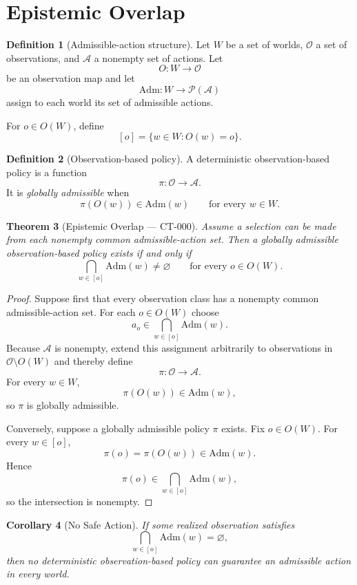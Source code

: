 \documentclass[11pt]{article}
\newtheorem{theorem}{Theorem}[section]
\newtheorem{corollary}[theorem]{Corollary}
\theoremstyle{definition}
\newtheorem{definition}[theorem]{Definition}
\theoremstyle{remark}
\newcommand{\worlds}{W}
\newcommand{\acts}{\mathcal{A}}
\newcommand{\obs}{\mathcal{O}}
\newcommand{\admissible}{\mathrm{Adm}}
\begin{document}
\section{Epistemic Overlap}

\begin{definition}[Admissible-action structure]
Let $\worlds$ be a set of worlds, $\obs$ a set of observations, and
$\acts$ a nonempty set of actions. Let
\[
  O : \worlds \to \obs
\]
be an observation map and let
\[
  \admissible : \worlds \to \mathcal{P}(\acts)
\]
assign to each world its set of admissible actions.

For $o \in O(\worlds)$, define
\[
  [o]
  =
  \{w \in \worlds : O(w)=o\}.
\]
\end{definition}

\begin{definition}[Observation-based policy]
A deterministic observation-based policy is a function
\[
  \pi : \obs \to \acts.
\]
It is \emph{globally admissible} when
\[
  \pi(O(w)) \in \admissible(w)
  \qquad
  \text{for every }w\in\worlds.
\]
\end{definition}

\begin{theorem}[Epistemic Overlap --- CT-000]
Assume a selection can be made from each nonempty common admissible-action
set. Then a globally admissible observation-based policy exists if and only if
\[
  \bigcap_{w\in[o]}\admissible(w)
  \neq\varnothing
  \qquad
  \text{for every }o\in O(\worlds).
\]
\end{theorem}

\begin{proof}
Suppose first that every observation class has a nonempty common
admissible-action set. For each $o\in O(\worlds)$ choose
\[
  a_o
  \in
  \bigcap_{w\in[o]}\admissible(w).
\]
Because $\acts$ is nonempty, extend this assignment arbitrarily to
observations in $\obs\setminus O(\worlds)$ and thereby define
\[
  \pi:\obs\to\acts.
\]
For every $w\in\worlds$,
\[
  \pi(O(w))
  \in
  \admissible(w),
\]
so $\pi$ is globally admissible.

Conversely, suppose a globally admissible policy $\pi$ exists. Fix
$o\in O(\worlds)$. For every $w\in[o]$,
\[
  \pi(o)
  =
  \pi(O(w))
  \in
  \admissible(w).
\]
Hence
\[
  \pi(o)
  \in
  \bigcap_{w\in[o]}\admissible(w),
\]
so the intersection is nonempty.
\end{proof}

\begin{corollary}[No Safe Action]
If some realized observation satisfies
\[
  \bigcap_{w\in[o]}\admissible(w)
  =
  \varnothing,
\]
then no deterministic observation-based policy can guarantee an admissible
action in every world.
\end{corollary}
\end{document}
